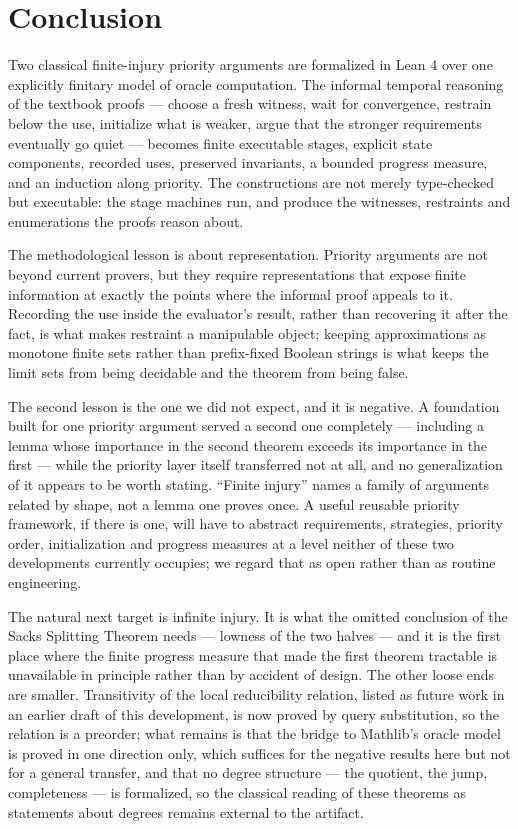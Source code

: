 \section{Conclusion}
\label{sec:conclusion}

Two classical finite-injury priority arguments are formalized in Lean 4
over one explicitly finitary model of oracle computation.  The informal
temporal reasoning of the textbook proofs --- choose a fresh witness, wait
for convergence, restrain below the use, initialize what is weaker, argue
that the stronger requirements eventually go quiet --- becomes finite
executable stages, explicit state components, recorded uses, preserved
invariants, a bounded progress measure, and an induction along priority.
The constructions are not merely type-checked but executable: the stage
machines run, and produce the witnesses, restraints and enumerations the
proofs reason about.

The methodological lesson is about representation.  Priority arguments are
not beyond current provers, but they require representations that expose
finite information at exactly the points where the informal proof appeals
to it.  Recording the use inside the evaluator's result, rather than
recovering it after the fact, is what makes restraint a manipulable object;
keeping approximations as monotone finite sets rather than prefix-fixed
Boolean strings is what keeps the limit sets from being decidable and the
theorem from being false.

The second lesson is the one we did not expect, and it is negative.  A
foundation built for one priority argument served a second one completely
--- including a lemma whose importance in the second theorem exceeds its
importance in the first --- while the priority layer itself transferred not
at all, and no generalization of it appears to be worth stating.  ``Finite
injury'' names a family of arguments related by shape, not a lemma one
proves once.  A useful reusable priority framework, if there is one, will
have to abstract requirements, strategies, priority order, initialization
and progress measures at a level neither of these two developments
currently occupies; we regard that as open rather than as routine
engineering.

The natural next target is infinite injury.  It is what the omitted
conclusion of the Sacks Splitting Theorem needs --- lowness of the two
halves --- and it is the first place where the finite progress measure that
made the first theorem tractable is unavailable in principle rather than by
accident of design.  The other loose ends are smaller.  Transitivity of the
local reducibility relation, listed as future work in an earlier draft of
this development, is now proved by query substitution, so the relation is a
preorder; what remains is that the bridge to Mathlib's oracle model is
proved in one direction only, which suffices for the negative results here
but not for a general transfer, and that no degree structure --- the
quotient, the jump, completeness --- is formalized, so the classical
reading of these theorems as statements about degrees remains external to
the artifact.
